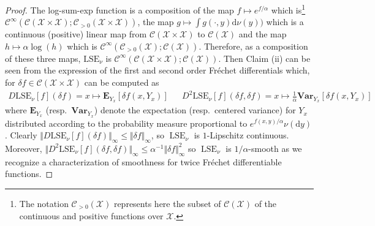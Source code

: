 \documentclass[11pt]{article}
\newcommand{\Cc}{\mathcal{C}}
\newcommand{\Xx}{\mathcal{X}}
\newcommand{\E}{\mathbf{E}}
\renewcommand{\d}{\mathrm{d}}
\DeclareMathOperator{\LSE}{LSE}
\begin{document}
{\begin{proof}
The log-sum-exp function is a composition of the map $f\mapsto e^{f/\alpha}$ which is\footnote{The notation $\Cc_{>0}(\Xx)$ represents here the subset of $\Cc(\Xx)$ of the continuous and positive functions over $\Xx$.} $\Cc^\infty(\Cc(\Xx\times \Xx);\Cc_{>0}(\Xx\times \Xx))$, the map $g\mapsto \int g(\cdot,y)\d\nu(y))$ which is a continuous (positive) linear map from $\Cc(\Xx\times \Xx)$ to $\Cc(\Xx)$ and the map $h\mapsto \alpha \log(h)$ which is $\Cc^\infty(\Cc_{>0}(\Xx );\Cc(\Xx))$. Therefore, as a composition of these three maps, $\mathrm{LSE}_\nu$ is $\Cc^\infty(\Cc(\Xx\times \Xx);\Cc(\Xx))$.
Then Claim (ii) can be seen from the expression of the first and second order Fréchet differentials which, for $\delta f \in \Cc(\Xx\times \Xx)$ can be computed as
\begin{align*}
D\mathrm{LSE}_\nu[f](\delta f) = x\mapsto \E_{Y_x}[ \delta f(x,Y_x)] && D^2\mathrm{LSE}_\nu[f](\delta f,\delta f) = x \mapsto \frac{1}{\alpha}\mathbf{Var}_{Y_x}[\delta f(x,Y_x)]
\end{align*}
where $\E_{Y_x}$ (resp.~$ \mathbf{Var}_{Y_x}$) denote the expectation (resp.~centered variance) for $Y_x$ distributed according to the probability measure proportional to $e^{f(x,y)/\alpha}\nu(\d y)$. Clearly $\Vert D\mathrm{LSE}_\nu[f](\delta f)\Vert_\infty\leq \Vert \delta f\Vert_\infty$, so $\LSE_\nu$ is $1$-Lipschitz continuous. Moreover, $\Vert D^2\mathrm{LSE}_\nu[f](\delta f,\delta f)\Vert_\infty\leq \alpha^{-1} \Vert \delta f\Vert_\infty^2$ so $\LSE_\nu$ is $1/\alpha$-smooth as we recognize a characterization of smoothness for twice Fréchet differentiable functions.
\end{proof}
}
\end{document}
